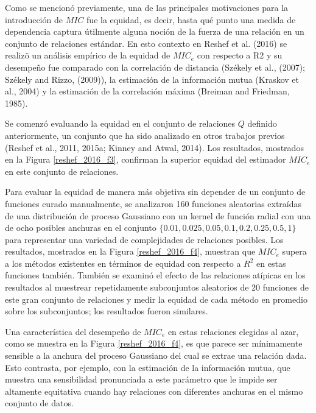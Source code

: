 	Como se mencion\'o previamente, una de las principales motivaciones para la introducci\'on de $MIC$ fue la equidad, es decir, hasta qu\'e punto una medida de dependencia captura \'utilmente alguna noci\'on de la fuerza de una relaci\'on en un conjunto de relaciones est\'andar. En esto contexto en Reshef et al. (2016) \cite{Reshef2016} se realiz\~o un an\'alisis emp\'irico de la equidad de $MIC_e$ con respecto a R2 y su desempe\~no fue comparado con la correlaci\'on de distancia (Sz\'ekely et al., (2007)\cite{Szekely2007}; Sz\'ekely and Rizzo, (2009)\cite{Szekely2009}), la estimaci\'on de la informaci\'on mutua (Kraskov et al., 2004) y la estimaci\'on de la correlaci\'on m\'axima (Breiman and Friedman, 1985).

	Se comenz\'o evaluando la equidad en el conjunto de relaciones $Q$ definido anteriormente, un conjunto que ha sido analizado en otros trabajos previos (Reshef et al., 2011, 2015a; Kinney and Atwal, 2014). Los resultados, mostrados en la Figura \ref{reshef_2016_f3}, confirman la superior equidad del estimador $MIC_e$ en este conjunto de relaciones.

	Para evaluar la equidad de manera m\'as objetiva sin depender de un conjunto de funciones curado manualmente, se analizaron 160 funciones aleatorias extra\'idas de una distribuci\'on de proceso Gaussiano con un kernel de funci\'on radial con una de ocho posibles anchuras en el conjunto $\{0.01, 0.025, 0.05, 0.1, 0.2, 0.25, 0.5, 1\}$ para representar una variedad de complejidades de relaciones posibles. Los resultados, mostrados en la Figura \ref{reshef_2016_f4}, muestran que $MIC_e$ supera a los m\'etodos existentes en t\'erminos de equidad con respecto a $R^2$ en estas funciones tambi\'en. Tambi\'en se examin\'o el efecto de las relaciones at\'ipicas en los resultados al muestrear repetidamente subconjuntos aleatorios de 20 funciones de este gran conjunto de relaciones y medir la equidad de cada m\'etodo en promedio sobre los subconjuntos; los resultados fueron similares.

	Una caracter\'istica del desempe\~no de $MIC_e$ en estas relaciones elegidas al azar, como se muestra en la Figura \ref{reshef_2016_f4}, es que parece ser m\'inimamente sensible a la anchura del proceso Gaussiano del cual se extrae una relaci\'on dada. Esto contrasta, por ejemplo, con la estimaci\'on de la informaci\'on mutua, que muestra una sensibilidad pronunciada a este par\'ametro que le impide ser altamente equitativa cuando hay relaciones con diferentes anchuras en el mismo conjunto de datos.

